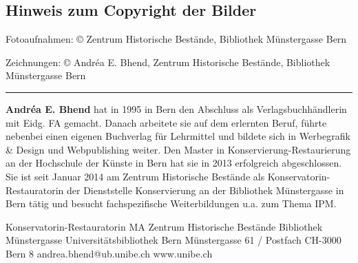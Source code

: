 \documentclass[a4paper,
fontsize=11pt,
oneside,
numbers=noperiodatend,
parskip=half-,
bibliography=totoc,
final
]{scrartcl}
\begin{document}
\hypertarget{hinweis-zum-copyright-der-bilder}{%
\subsection{Hinweis zum Copyright der
Bilder}\label{hinweis-zum-copyright-der-bilder}}

Fotoaufnahmen: © Zentrum Historische Bestände, Bibliothek Münstergasse
Bern

Zeichnungen: © Andréa E. Bhend, Zentrum Historische Bestände, Bibliothek
Münstergasse Bern

\begin{center}\rule{0.5\linewidth}{0.5pt}\end{center}

\textbf{Andréa E. Bhend} hat in 1995 in Bern den Abschluss als
Verlagsbuchhändlerin mit Eidg. FA gemacht. Danach arbeitete sie auf dem
erlernten Beruf, führte nebenbei einen eigenen Buchverlag für Lehrmittel
und bildete sich in Werbegrafik \& Design und Webpublishing weiter. Den
Master in Konservierung-Restaurierung an der Hochschule der Künste in
Bern hat sie in 2013 erfolgreich abgeschlossen. Sie ist seit Januar 2014
am Zentrum Historische Bestände als Konservatorin-Restauratorin der
Dienststelle Konservierung an der Bibliothek Münstergasse in Bern tätig
und besucht fachspezifische Weiterbildungen u.a. zum Thema IPM.

Konservatorin-Restauratorin MA\newline
Zentrum Historische Bestände\newline
Bibliothek Münstergasse\newline
Universitätsbibliothek Bern\newline
Münstergasse 61 / Postfach\newline
CH-3000 Bern 8\newline
andrea.bhend@ub.unibe.ch\newline
www.unibe.ch
\end{document}
